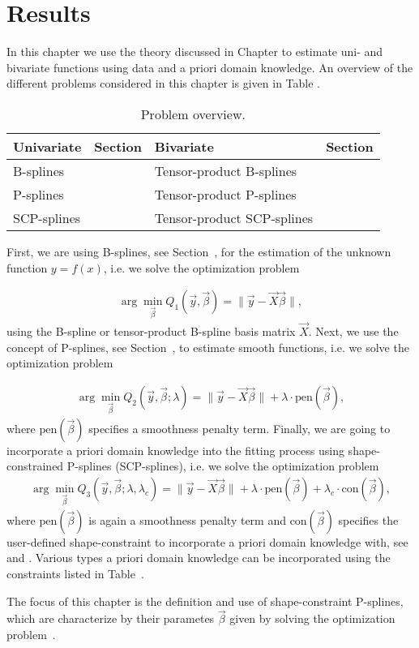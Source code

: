 \chapter{Results}
In this chapter we use the theory discussed in Chapter  to estimate uni- and bivariate  functions using data and a priori domain knowledge. An overview of the different problems considered in this chapter is given in Table . 

\begin{table}[H]
	\centering
	\begin{tabular}{|l|l|l|l|}
		\hline
		\textbf{Univariate}   & \textbf{Section} & \textbf{Bivariate}         & \textbf{Section} \\ \hline \toprule
		B-splines             &                & Tensor-product B-splines   &               \\ \hline
		P-splines             &                & Tensor-product P-splines   &              \\ \hline
		SCP-splines           & 			   & Tensor-product SCP-splines &     \\ \hline \bottomrule
	\end{tabular}
	\caption{Problem overview.}
	\label{tab:problem_overview}
\end{table}
%
First, we are using B-splines, see Section~, for the estimation of the unknown function $y = f(x)$, i.e. we solve the optimization problem

\begin{align} \label{eq:OF-B-splines}
	\arg \min_{\vec{\beta}} Q_1(\vec{y}, \vec{\beta}) = \lVert \vec{y} - \vec{X} \vec{\beta} \rVert,
\end{align}
%
using the B-spline or tensor-product B-spline basis matrix $\vec{X}$. Next, we use the concept of P-splines, see Section~, to estimate smooth functions, i.e. we solve the optimization problem

\begin{align} \label{eq:OF-P-splines}
	\arg \min_{\vec{\beta}} Q_2(\vec{y}, \vec{\beta}; \lambda) = \lVert \vec{y} - \vec{X} \vec{\beta} \rVert + \lambda \cdot \text{pen}(\vec{\beta}),
\end{align}
%
where $\text{pen}(\vec{\beta})$ specifies a smoothness penalty term. Finally, we are going to incorporate a priori domain knowledge into the fitting process using shape-constrained P-splines (SCP-splines), i.e. we solve the optimization problem
\begin{align} \label{eq:OF-SCP-splines}
	\arg \min_{\vec{\beta}} Q_3(\vec{y}, \vec{\beta}; \lambda, \lambda_c) = \lVert \vec{y} - \vec{X} \vec{\beta} \rVert + \lambda \cdot \text{pen}(\vec{\beta}) + \lambda_c \cdot \text{con}(\vec{\beta}),
\end{align}
%
where $\text{pen}(\vec{\beta})$ is again a smoothness penalty term and $\text{con}({\vec{\beta}})$ specifies the user-defined shape-constraint to incorporate a priori domain knowledge with, see \cite{hofner2011monotonicity} and \cite{bollaerts2006simple}. Various types a priori domain knowledge can be incorporated using the constraints listed in Table~.



The focus of this chapter is the definition and use of shape-constraint P-splines, which are characterize by their parametes $\vec{\beta}$ given by solving the optimization problem~.

